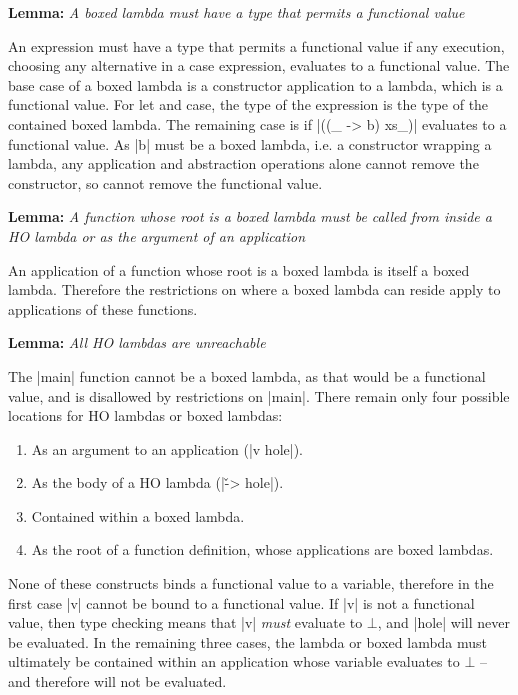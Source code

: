 \documentclass{sigplanconf}
\newenvironment{lemma}[1]
    {\smallskip
     \noindent\textbf{Lemma:} \textit{#1}}
    {\noexample}
\begin{document}
\begin{lemma}{A boxed lambda must have a type that permits a functional value}

An expression must have a type that permits a functional value if any execution, choosing any alternative in a case expression, evaluates to a functional value. The base case of a boxed lambda is a constructor application to a lambda, which is a functional value. For let and case, the type of the expression is the type of the contained boxed lambda. The remaining case is if |((\vs_ -> b) xs_)| evaluates to a functional value. As |b| must be a boxed lambda, i.e. a constructor wrapping a lambda, any application and abstraction operations alone cannot remove the constructor, so cannot remove the functional value.
\end{lemma}

\begin{lemma}{A function whose root is a boxed lambda must be called from inside a HO lambda or as the argument of an application}

An application of a function whose root is a boxed lambda is itself a boxed lambda. Therefore the restrictions on where a boxed lambda can reside apply to applications of these functions.
\end{lemma}

\begin{lemma}{All HO lambdas are unreachable}

The |main| function cannot be a boxed lambda, as that would be a functional value, and is disallowed by restrictions on |main|. There remain only four possible locations for HO lambdas or boxed lambdas:

\begin{enumerate}
\item As an argument to an application (|v hole|).
\item As the body of a HO lambda (|\v -> hole|).
\item Contained within a boxed lambda.
\item As the root of a function definition, whose applications are boxed lambdas.
\end{enumerate}

None of these constructs binds a functional value to a variable, therefore in the first case |v| cannot be bound to a functional value. If |v| is not a functional value, then type checking means that |v| \textit{must} evaluate to $\bot{}$, and |hole| will never be evaluated. In the remaining three cases, the lambda or boxed lambda must ultimately be contained within an application whose variable evaluates to $\bot{}$ -- and therefore will not be evaluated.
\end{lemma}
\end{document}
